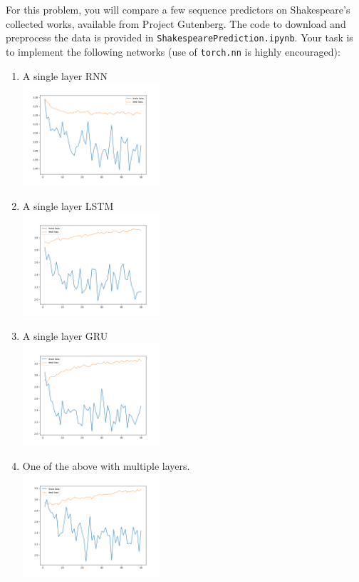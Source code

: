 \documentclass{article}[12pt]
\begin{document}
For this problem, you will compare a few sequence predictors on Shakespeare's collected works, available from Project Gutenberg. The code to download and preprocess the data is provided in \texttt{ShakespearePrediction.ipynb}. Your task is to implement the following networks (use of \texttt{torch.nn} is highly encouraged):
\begin{enumerate}
    \item A single layer RNN \\
    \includegraphics[width=0.4\textwidth]{RNN.png}
    \item A single layer LSTM \\
    \includegraphics[width=0.4\textwidth]{LTSM.png}
    \item A single layer GRU \\
    \includegraphics[width=0.4\textwidth]{GRU.png}
    \item One of the above with multiple layers. \\
    \includegraphics[width=0.4\textwidth]{Multilayer.png}
\end{enumerate}
\end{document}
